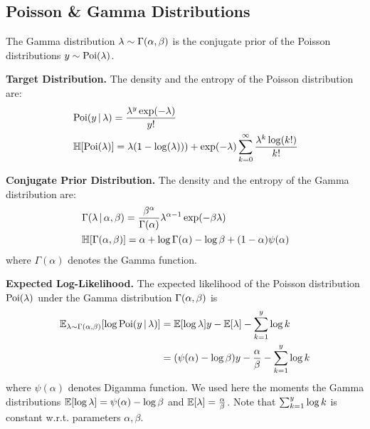 \subsection{Poisson \& Gamma Distributions}

The Gamma distribution $\lambda \sim \operatorname{\Gamma}(\alpha, \beta)$ is the conjugate prior of the Poisson distributions $y \sim \operatorname{Poi}(\lambda)$. 

\textbf{Target Distribution.} The density and the entropy of the Poisson distribution are:
%
\begin{align}\label{eq:density-entropy-poisson}
    &\operatorname{Poi}(y \,|\, \lambda) = \frac{\lambda^y \exp(-\lambda)}{y!}\\
    &\operatorname{\mathbb{H}}[\operatorname{Poi}(\lambda)] = \lambda(1 - \log(\lambda))) + \exp(-\lambda)\sum_{k=0}^{\infty}\frac{\lambda^k\log(k!)}{k!}
\end{align}

\textbf{Conjugate Prior Distribution.} The density and the entropy of the Gamma distribution are:
%
\begin{align}\label{eq:density-entropy-gamma}
        &\operatorname{\Gamma}(\lambda \,|\, \alpha, \beta) = \frac{\beta^\alpha}{\Gamma(\alpha)} \lambda^{\alpha - 1}\exp(-\beta \lambda)\\
        &\operatorname{\mathbb{H}}[\operatorname{\Gamma}(\alpha, \beta)] = \alpha + \log{\Gamma(\alpha)} - \log{\beta} + (1 - \alpha) \psi(\alpha)
\end{align}
%
where $\Gamma(\alpha)$ denotes the Gamma function.

\textbf{Expected Log-Likelihood.} The expected likelihood of the Poisson distribution $\operatorname{Poi}(\lambda)$ under the Gamma distribution $\operatorname{\Gamma}(\alpha, \beta)$ is
%
\begin{align}\label{eq:expected-likelihood-poisson-gamma}
\operatorname{\mathbb{E}}_{\lambda \sim \operatorname{\Gamma}(\alpha, \beta)}[\log \operatorname{Poi}(y \,|\, \lambda)] &= \operatorname{\mathbb{E}}[\log{\lambda}] y - \operatorname{\mathbb{E}}[\lambda] - \sum_{k=1}^{y} \log k\\
    &= (\psi(\alpha) - \log{\beta}) y - \frac{\alpha}{\beta} - \sum_{k=1}^{y} \log k
\end{align}
%
where $\psi(\alpha)$ denotes Digamma function. We used here the moments the Gamma distributions $\operatorname{\mathbb{E}}[\log{\lambda}]=\psi(\alpha) - \log{\beta}$ and $\operatorname{\mathbb{E}}[\lambda]=\frac{\alpha}{\beta}$. Note that $\sum_{k=1}^{y} \log k$ is constant w.r.t. parameters $\alpha, \beta$.


